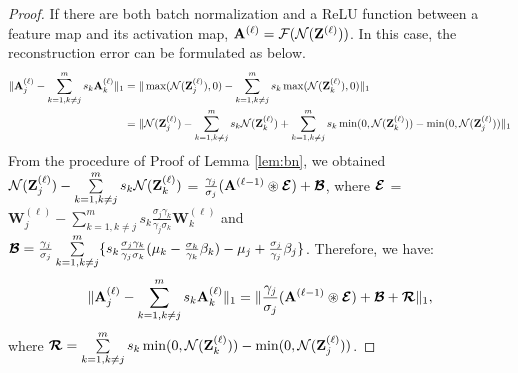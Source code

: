 \begin{proof}
If there are both batch normalization and a ReLU function between a feature map and its activation map, $\mathbf{A}^{(\ell)} = \mathcal{F}(\mathcal{N}(\mathbf{Z}^{(\ell)}))$. In this case, the reconstruction error can be formulated as below.
\small
\begin{eqnarray}
\begin{split}
 \|\mathbf{A}_{j}^{(\ell)}-\sum\limits_{k = 1, k \neq j}^{m}{s_{k}} \mathbf{A}_{k}^{(\ell)}\|_{1} &=\|\max(\mathcal{N}(\mathbf{Z}_{j}^{(\ell)}),0) - \sum\limits_{k=1, k \neq j}^{m} s_{k} \max(\mathcal{N}(\mathbf{Z}_{k}^{(\ell)}),0)\|_{1}\\
  &=\|\mathcal{N}(\mathbf{Z}_{j}^{(\ell)}) - \sum\limits_{k = 1, k \neq j}^{m}{s_{k}}\mathcal{N}(\mathbf{Z}_k^{(\ell)}) + \sum\limits_{k=1, k \neq j}^{m} s_{k} \min(0,\mathcal{N}(\mathbf{Z}_{k}^{(\ell)})) - \min(0, \mathcal{N}(\mathbf{Z}_j^{(\ell)}))\|_{1}\\
\end{split}\nonumber
\end{eqnarray}
From the procedure of Proof of Lemma \ref{lem:bn}, we obtained $\mathcal{N}(\mathbf{Z}_j^{(\ell)}) - \sum\limits_{k = 1, k \neq j }^{m} s_{k} \mathcal{N}(\mathbf{Z}_k^{(\ell)}) $ = $\frac{\gamma_{j}}{\sigma_{j}}(\mathbf{A}^{(\ell-1)} \circledast \boldsymbol{\mathcal{E}}) + \boldsymbol{\mathcal{B}}$, where $\boldsymbol{\mathcal{E}}$ = $\mathbf{W}_j^{(\ell)} - \sum\limits_{k = 1, k \neq j}^{m}s_k\frac{\sigma_{j}\gamma_{k}}{\gamma_{j}\sigma_{k}}\mathbf{W}_k^{(\ell)} $ and $\boldsymbol{\mathcal{B}} =\frac{\gamma_{j}}{\sigma_{j}}\sum\limits_{k = 1, k \neq j}^{m} \{s_k \frac{\sigma_{j}\gamma_{k}}{\gamma_{j}\sigma_{k}}(\mu_k - \frac{\sigma_{k}}{\gamma_{k}}\beta_k) - \mu_j +\frac{\sigma_{j}}{\gamma_{j}}\beta_j \}$.
Therefore, we have:
\begin{equation}
    \|\mathbf{A}_{j}^{(\ell)}-\sum\limits_{k = 1, k \neq j}^{m}{s_{k}} \mathbf{A}_{k}^{(\ell)}\|_{1} = \|\frac{\gamma_{j}}{\sigma_{j}}(\mathbf{A}^{(\ell-1)} \circledast \boldsymbol{\mathcal{E}}) + \boldsymbol{\mathcal{B}} + \boldsymbol{\mathcal{R}} \|_{1},
    \nonumber
\end{equation}
where $\boldsymbol{\mathcal{R}} = \sum\limits_{k=1, k \neq j}^{m} s_{k}  \min(0,\mathcal{N}(\mathbf{Z}_{k}^{(\ell)}))-\min(0,\mathcal{N}(\mathbf{Z}_{j}^{(\ell)}))$.
\end{proof}


